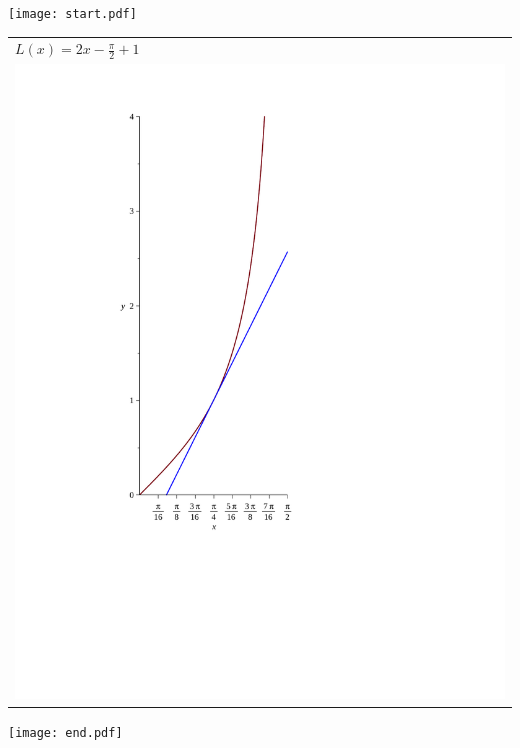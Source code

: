 \documentclass[12pt]{article}
\begin{document}
\begin{enumerate}
\texttt{[image: start.pdf]}
{{\begin{tabular}{l}
$L(x)=2x-\frac{\pi}{2}+1$\\
\includegraphics[scale=0.3]{graph4.pdf}
\end{tabular}
}}
\texttt{[image: end.pdf]}


\end{enumerate}

\end{document}

